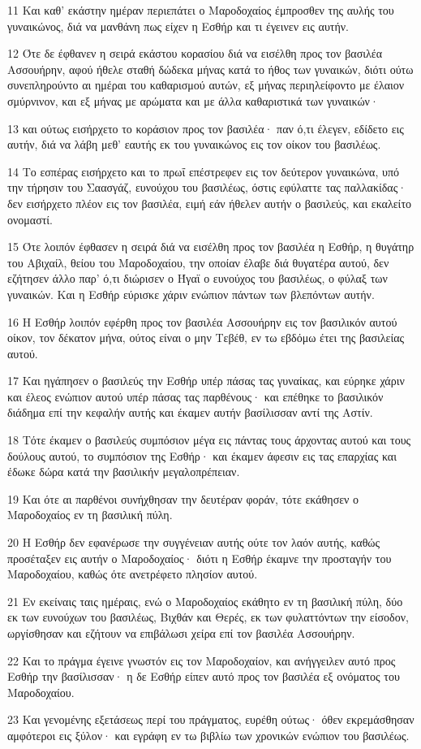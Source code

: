 \par 11 Και καθ' εκάστην ημέραν περιεπάτει ο Μαροδοχαίος έμπροσθεν της αυλής του γυναικώνος, διά να μανθάνη πως είχεν η Εσθήρ και τι έγεινεν εις αυτήν.
\par 12 Ότε δε έφθανεν η σειρά εκάστου κορασίου διά να εισέλθη προς τον βασιλέα Ασσουήρην, αφού ήθελε σταθή δώδεκα μήνας κατά το ήθος των γυναικών, διότι ούτω συνεπληρούντο αι ημέραι του καθαρισμού αυτών, εξ μήνας περιηλείφοντο με έλαιον σμύρνινον, και εξ μήνας με αρώματα και με άλλα καθαριστικά των γυναικών·
\par 13 και ούτως εισήρχετο το κοράσιον προς τον βασιλέα· παν ό,τι έλεγεν, εδίδετο εις αυτήν, διά να λάβη μεθ' εαυτής εκ του γυναικώνος εις τον οίκον του βασιλέως.
\par 14 Το εσπέρας εισήρχετο και το πρωΐ επέστρεφεν εις τον δεύτερον γυναικώνα, υπό την τήρησιν του Σαασγάζ, ευνούχου του βασιλέως, όστις εφύλαττε τας παλλακίδας· δεν εισήρχετο πλέον εις τον βασιλέα, ειμή εάν ήθελεν αυτήν ο βασιλεύς, και εκαλείτο ονομαστί.
\par 15 Ότε λοιπόν έφθασεν η σειρά διά να εισέλθη προς τον βασιλέα η Εσθήρ, η θυγάτηρ του Αβιχαίλ, θείου του Μαροδοχαίου, την οποίαν έλαβε διά θυγατέρα αυτού, δεν εζήτησεν άλλο παρ' ό,τι διώρισεν ο Ήγαϊ ο ευνούχος του βασιλέως, ο φύλαξ των γυναικών. Και η Εσθήρ εύρισκε χάριν ενώπιον πάντων των βλεπόντων αυτήν.
\par 16 Η Εσθήρ λοιπόν εφέρθη προς τον βασιλέα Ασσουήρην εις τον βασιλικόν αυτού οίκον, τον δέκατον μήνα, ούτος είναι ο μην Τεβέθ, εν τω εβδόμω έτει της βασιλείας αυτού.
\par 17 Και ηγάπησεν ο βασιλεύς την Εσθήρ υπέρ πάσας τας γυναίκας, και εύρηκε χάριν και έλεος ενώπιον αυτού υπέρ πάσας τας παρθένους· και επέθηκε το βασιλικόν διάδημα επί την κεφαλήν αυτής και έκαμεν αυτήν βασίλισσαν αντί της Αστίν.
\par 18 Τότε έκαμεν ο βασιλεύς συμπόσιον μέγα εις πάντας τους άρχοντας αυτού και τους δούλους αυτού, το συμπόσιον της Εσθήρ· και έκαμεν άφεσιν εις τας επαρχίας και έδωκε δώρα κατά την βασιλικήν μεγαλοπρέπειαν.
\par 19 Και ότε αι παρθένοι συνήχθησαν την δευτέραν φοράν, τότε εκάθησεν ο Μαροδοχαίος εν τη βασιλική πύλη.
\par 20 Η Εσθήρ δεν εφανέρωσε την συγγένειαν αυτής ούτε τον λαόν αυτής, καθώς προσέταξεν εις αυτήν ο Μαροδοχαίος· διότι η Εσθήρ έκαμνε την προσταγήν του Μαροδοχαίου, καθώς ότε ανετρέφετο πλησίον αυτού.
\par 21 Εν εκείναις ταις ημέραις, ενώ ο Μαροδοχαίος εκάθητο εν τη βασιλική πύλη, δύο εκ των ευνούχων του βασιλέως, Βιχθάν και Θερές, εκ των φυλαττόντων την είσοδον, ωργίσθησαν και εζήτουν να επιβάλωσι χείρα επί τον βασιλέα Ασσουήρην.
\par 22 Και το πράγμα έγεινε γνωστόν εις τον Μαροδοχαίον, και ανήγγειλεν αυτό προς Εσθήρ την βασίλισσαν· η δε Εσθήρ είπεν αυτό προς τον βασιλέα εξ ονόματος του Μαροδοχαίου.
\par 23 Και γενομένης εξετάσεως περί του πράγματος, ευρέθη ούτως· όθεν εκρεμάσθησαν αμφότεροι εις ξύλον· και εγράφη εν τω βιβλίω των χρονικών ενώπιον του βασιλέως.

